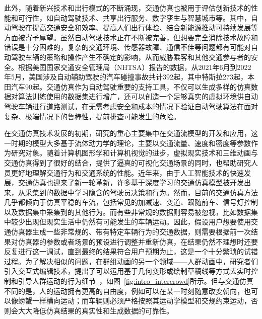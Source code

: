 
此外，随着新兴技术和出行模式的不断涌现，交通仿真也被用于评估创新技术的性能和可行性，如自动驾驶技术、共享出行服务、数字孪生与智慧城市等。其中，自动驾驶在提高交通安全和效率、提高人们出行体验、结合新能源推动可持续发展等方面被寄予厚望。虽然自动驾驶技术正在不断被完善，但想要完全消除技术故障和错误是十分困难的，复杂的交通环境、传感器故障、通信不佳等问题都有可能对自动驾驶车辆的策略和操作产生不确定的影响，从而威胁乘客和其他交通参与者的安全。根据美国国家交通安全管理局（NHTSA）报告的数据，从2021年6月到2022年5月，美国涉及自动辅助驾驶的汽车碰撞事故共计392起，其中特斯拉273起，本田汽车90起。交通仿真作为自动驾驶重要的支持工具，不仅可以生成多样的仿真数据对算法训练使用的数据集进行增广，还可以创造一个足够真实的虚拟环境供自动驾驶车辆进行道路测试，在无需考虑安全和成本的情况下验证自动驾驶算法在面对复杂、极端情况下的鲁棒性，提前排查可能发生的危险。

在交通仿真技术发展的初期，研究的重心主要集中在交通流模型的开发和应用，这一时期的模型大多基于流体动力学的理论，主要以交通流量、速度和密度等参数作为研究对象。随着计算机图形学和计算机视觉的进步，虚拟现实技术和三维动画与交通仿真得到了很好的结合，提供了逼真的可视化交通场景的同时，也帮助研究人员更好地理解交通行为和交通系统的性能。近年来，由于人工智能技术的快速发展，交通仿真也迎来了新一轮革新，许多基于深度学习的交通仿真模型被开发出来，从采集到的数据中学习隐含的驾驶员决策和行为。然而，目前的交通仿真方法几乎都倾向于仿真平稳的车流，包括常见的加减速、变道、跟随前车、信号灯控制以及数据集中采集到的其他行为。而有些非常规的数据则容易被忽视，比如数据集中较少出现但现实生活中仍然有可能发生的车辆运动。因此，假设用户想要使用交通仿真器生成一些非常规的、带有特定车辆行为的交通数据，则需要根据前一次结果对仿真器的参数或者场景的预设进行调整并重新仿真，在结果仍然不理想时还要反复进行这一调试，直到最终的结果符合用户预期为止，这是一个十分繁琐的试错过程。为了解决相似的问题，在群组动画的另一个领域——人群动画中，研究者们引入交互式编辑技术，提出了可以运用基于几何变形或绘制草稿线等方式去实时控制和引导人群运动的行为细节~\cite{kim2014interactive, montana2017sketching}，如图~\ref{fig:intro_intercrowd}所示。但与交通仿真不同的是，人的运动拥有更高的自由度，例如可以在某一时刻随意改变朝向，也可以像螃蟹一样横向运动；而车辆则必须严格按照其运动学模型和交规约束运动，否则会大大降低仿真结果的真实性和生成数据的可靠性。

